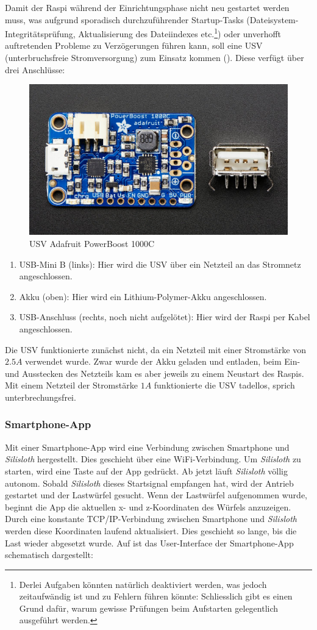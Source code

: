 Damit der Raspi während der Einrichtungsphase nicht neu gestartet werden muss, was aufgrund sporadisch durchzuführender Startup-Tasks (Dateisystem-Integritätsprüfung, Aktualisierung des Dateiindexes etc.\footnote{Derlei Aufgaben könnten natürlich deaktiviert werden, was jedoch zeitaufwändig ist und zu Fehlern führen könnte: Schliesslich gibt es einen Grund dafür, warum gewisse Prüfungen beim Aufstarten gelegentlich ausgeführt werden.}) oder unverhofft auftretenden Probleme zu Verzögerungen führen kann, soll eine USV (unterbruchsfreie Stromversorgung) zum Einsatz kommen (). Diese verfügt über drei Anschlüsse:

\begin{figure}
    \centering
    \includegraphics[width=0.5\linewidth]{pics/usv.jpg}
    \caption{USV Adafruit PowerBoost 1000C}
    \label{fig:usv}
\end{figure}

\begin{enumerate}
\item USB-Mini B (links): Hier wird die USV über ein Netzteil an das Stromnetz angeschlossen.
\item Akku (oben): Hier wird ein Lithium-Polymer-Akku angeschlossen.
\item USB-Anschluss (rechts, noch nicht aufgelötet): Hier wird der Raspi per Kabel angeschlossen.
\end{enumerate}

Die USV funktionierte zunächst nicht, da ein Netzteil mit einer Stromstärke von $2.5A$ verwendet wurde. Zwar wurde der Akku geladen und entladen, beim Ein- und Ausstecken des Netzteils kam es aber jeweils zu einem Neustart des Raspis. Mit einem Netzteil der Stromstärke $1A$ funktionierte die USV tadellos, sprich unterbrechungsfrei.

\subsubsection{Smartphone-App}
Mit einer Smartphone-App wird eine Verbindung zwischen Smartphone und \textit{Silisloth} hergestellt. Dies geschieht über eine WiFi-Verbindung. Um \textit{Silisloth} zu starten, wird eine Taste auf der App gedrückt. Ab jetzt läuft \textit{Silisloth} völlig autonom. Sobald \textit{Silisloth} dieses Startsignal empfangen hat, wird der Antrieb gestartet und der Lastwürfel gesucht. Wenn der Lastwürfel aufgenommen wurde, beginnt die App die aktuellen x- und z-Koordinaten des Würfels anzuzeigen. Durch eine konstante TCP/IP-Ver\-bin\-dung zwischen Smartphone und \textit{Silisloth} werden diese Koordinaten laufend aktualisiert. Dies geschieht so lange, bis die Last wieder abgesetzt wurde. Auf  ist das User-Interface der Smartphone-App schematisch dargestellt:

